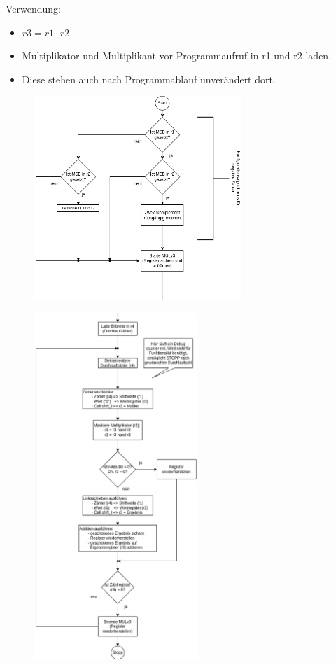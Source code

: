 \documentclass[fleqn, a4paper, 11pt]{article}       %
\begin{document}
\noindent Verwendung:
\begin{itemize}
	\item $r3 = r1 \cdot r2$
	\item Multiplikator und Multiplikant vor Programmaufruf in r1 und r2 laden.
	\item Diese stehen auch nach Programmablauf unverändert                dort.
\end{itemize}
\vspace{4cm}
\begin{figure}[h]
    \centering
    \includegraphics[width =0.7\textwidth]{MULv3-1.png}
\end{figure}

\newpage

\begin{figure}[h]
    \centering
    \includegraphics[width =0.55\textwidth]{MULv3-2v.png}
\end{figure}


%




\newpage
\printbibliography  %
\end{document}

